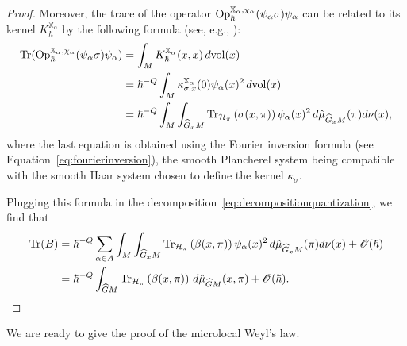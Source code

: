\documentclass[12pt,a4paper]{amsart}
\theoremstyle{plain}
\theoremstyle{definition}
\theoremstyle{remark}
\numberwithin{equation}{section}
\theoremstyle{definition}
\def \Op{{\rm Op}}
\def \O{\mathscr{O}}
\def \bX{\mathbb{X}}
\def \Ghat{\widehat{G}}
\numberwithin{equation}{section}
\begin{document}
\begin{proof}
Moreover, the trace of the operator $\Op_\hbar^{\bX_\alpha,\chi_\alpha}(\psi_\alpha \sigma)\psi_\alpha$ can be related to its kernel $K_\hbar^{\bX_\alpha}$ by the following formula (see, e.g., \cite[Theorem C.18]{Zwo}):
\begin{equation*}
    \begin{aligned}
    {\rm Tr}(\Op_\hbar^{\bX_\alpha,\chi_\alpha}(\psi_\alpha \sigma)\psi_\alpha) 
    &= \int_{M} K_\hbar^{\bX_\alpha}(x,x)\,d{\rm vol}(x)\\
    &= \hbar^{-Q}\int_{M} \kappa_{\sigma,x}^{\bX_\alpha}(0)\psi_\alpha(x)^2\,d{\rm vol}(x)\\
    &= \hbar^{-Q}\int_{M} \int_{\Ghat_x M} {\rm Tr}_{\mathcal{H}_\pi}\left(\sigma(x,\pi)\right)\psi_{\alpha}(x)^2\,d\hat{\mu}_{\Ghat_x M}(\pi)d\nu(x),
    \end{aligned}
\end{equation*}
where the last equation is obtained using the Fourier inversion formula (see Equation~\eqref{eq:fourierinversion}), the smooth Plancherel system being compatible with the smooth Haar system chosen to define the kernel $\kappa_{\sigma}$.

Plugging this formula in the decomposition~\eqref{eq:decompositionquantization}, we find that
\begin{equation*}
    \begin{aligned}
    {\rm Tr}(B) &= \hbar^{-Q}\sum_{\alpha\in A}\int_{M} \int_{\Ghat_x M} {\rm Tr}_{\mathcal{H}_\pi}\left(\beta(x,\pi)\right)\psi_{\alpha}(x)^2\,d\hat{\mu}_{\Ghat_x M}(\pi)d\nu(x) + \O(\hbar)\\
    &=\hbar^{-Q}\int_{\Ghat M} {\rm Tr}_{\mathcal{H}_\pi}\left(\beta(x,\pi)\right)\,d\hat{\mu}_{\Ghat M}(x,\pi) + \O(\hbar).
    \end{aligned}
\end{equation*}
\end{proof}

We are ready to give the proof of the microlocal Weyl's law.
\end{document}
